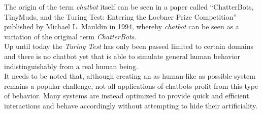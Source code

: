 The origin of the term \emph{chatbot} itself can be seen in a paper called ``ChatterBots, TinyMuds, and the Turing Test: Entering the Loebner Prize Competition'' published by Michael L. Mauldin in 1994, whereby \emph{chatbot} can be seen as a variation of the original term \emph{ChatterBots}.\cite{aiconf}
\\

Up until today the \emph{Turing Test} has only been passed limited to certain domains and there is no chatbot yet that is able to simulate general human behavior indistinguishably from a real human being.
\\
It needs to be noted that, although creating an as human-like as possible system remains a popular challenge, not all applications of chatbots profit from this type of behavior.
Many systems are instead optimized to provide quick and efficient interactions and behave accordingly without attempting to hide their artificiality.
